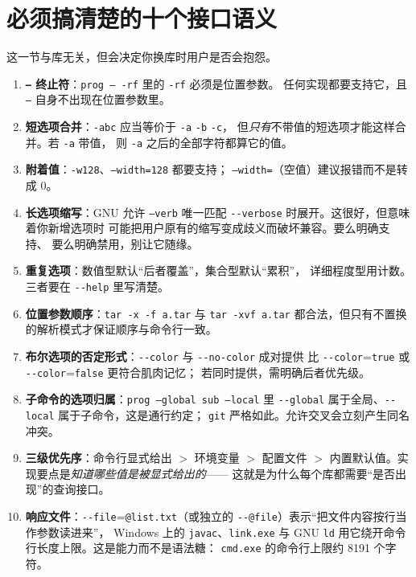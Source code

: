\documentclass[12pt,a4paper,fontset=fandol]{ctexbook}
\newcommand{\Tp}[1]{\texttt{#1}}
\newcommand{\Opt}[1]{\texttt{-\/-#1}}
\newcommand{\Short}[1]{\texttt{-#1}}
\begin{document}
\section{必须搞清楚的十个接口语义}

这一节与库无关，但会决定你换库时用户是否会抱怨。

\begin{enumerate}
\item \textbf{\Tp{--} 终止符}：\Tp{prog -- -rf} 里的 \Tp{-rf} 必须是位置参数。
      任何实现都要支持它，且 \Tp{--} 自身不出现在位置参数里。
\item \textbf{短选项合并}：\Short{abc} 应当等价于 \Short{a} \Short{b} \Short{c}，
      但\emph{只有}不带值的短选项才能这样合并。若 \Short{a} 带值，
      则 \Tp{-a} 之后的全部字符都算它的值。
\item \textbf{附着值}：\Tp{-w128}、\Tp{--width=128} 都要支持；
      \Tp{--width=}（空值）建议报错而不是转成 0。
\item \textbf{长选项缩写}：GNU 允许 \Tp{--verb} 唯一匹配
      \Opt{verbose} 时展开。这很好，但意味着你新增选项时
      可能把用户原有的缩写变成歧义而破坏兼容。要么明确支持、
      要么明确禁用，别让它随缘。
\item \textbf{重复选项}：数值型默认``后者覆盖''，集合型默认``累积''，
      详细程度型用计数。三者要在 \Opt{help} 里写清楚。
\item \textbf{位置参数顺序}：\Tp{tar -x -f a.tar} 与 \Tp{tar -xvf a.tar}
      都合法，但只有不置换的解析模式才保证顺序与命令行一致。
\item \textbf{布尔选项的否定形式}：\Opt{color} 与 \Opt{no-color} 成对提供
      比 \Opt{color}=\Tp{true} 或 \Opt{color}=\Tp{false} 更符合肌肉记忆；
      若同时提供，需明确后者优先级。
\item \textbf{子命令的选项归属}：\Tp{prog --global sub --local} 里
      \Opt{global} 属于全局、\Opt{local} 属于子命令，这是通行约定；
      \Tp{git} 严格如此。允许交叉会立刻产生同名冲突。
\item \textbf{三级优先序}：命令行显式给出 $>$ 环境变量 $>$ 配置文件 $>$
      内置默认值。实现要点是\emph{知道哪些值是被显式给出的}——
      这就是为什么每个库都需要``是否出现''的查询接口。
\item \textbf{响应文件}：\Opt{file}=\Tp{@list.txt}（或独立的
      \Opt{@file}）表示``把文件内容按行当作参数读进来''，
      Windows 上的 \Tp{javac}、\Tp{link.exe} 与 GNU \Tp{ld}
      用它绕开命令行长度上限。这是能力而不是语法糖：
      \Tp{cmd.exe} 的命令行上限约 8191 个字符。
\end{enumerate}
\end{document}
